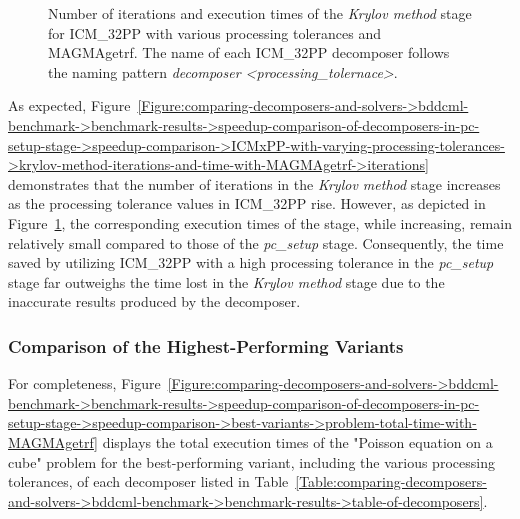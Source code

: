 \begin{figure}[ht!]
\begin{subfigure}{\textwidth}
		\label{Figure:comparing-decomposers-and-solvers->bddcml-benchmark->benchmark-results->speedup-comparison-of-decomposers-in-pc-setup-stage->speedup-comparison->ICMxPP-with-varying-processing-tolerances->krylov-method-iterations-and-time-with-MAGMAgetrf->time}
	\end{subfigure}
	\caption{Number of iterations and execution times of the \textit{Krylov method} stage for ICM\_32PP with various processing tolerances and MAGMAgetrf.
		The name of each ICM\_32PP decomposer follows the naming pattern \textit{decomposer <processing\_tolernace>}.
	}
	\label{Figure:comparing-decomposers-and-solvers->bddcml-benchmark->benchmark-results->speedup-comparison-of-decomposers-in-pc-setup-stage->speedup-comparison->ICMxPP-with-varying-processing-tolerances->krylov-method-iterations-and-time-with-MAGMAgetrf}
\end{figure}

As expected, Figure~\ref{Figure:comparing-decomposers-and-solvers->bddcml-benchmark->benchmark-results->speedup-comparison-of-decomposers-in-pc-setup-stage->speedup-comparison->ICMxPP-with-varying-processing-tolerances->krylov-method-iterations-and-time-with-MAGMAgetrf->iterations} demonstrates that the number of iterations in the \textit{Krylov method} stage increases as the processing tolerance values in ICM\_32PP rise.
However, as depicted in Figure~\ref{Figure:comparing-decomposers-and-solvers->bddcml-benchmark->benchmark-results->speedup-comparison-of-decomposers-in-pc-setup-stage->speedup-comparison->ICMxPP-with-varying-processing-tolerances->krylov-method-iterations-and-time-with-MAGMAgetrf->time}, the corresponding execution times of the stage, while increasing, remain relatively small compared to those of the \textit{pc\_setup} stage.
Consequently, the time saved by utilizing ICM\_32PP with a high processing tolerance in the \textit{pc\_setup} stage far outweighs the time lost in the \textit{Krylov method} stage due to the inaccurate results produced by the decomposer.

\subsubsection{Comparison of the Highest-Performing Variants} For completeness, Figure~\ref{Figure:comparing-decomposers-and-solvers->bddcml-benchmark->benchmark-results->speedup-comparison-of-decomposers-in-pc-setup-stage->speedup-comparison->best-variants->problem-total-time-with-MAGMAgetrf} displays the total execution times of the "Poisson equation on a cube" problem for the best-performing variant, including the various processing tolerances, of each decomposer listed in Table~\ref{Table:comparing-decomposers-and-solvers->bddcml-benchmark->benchmark-results->table-of-decomposers}.

